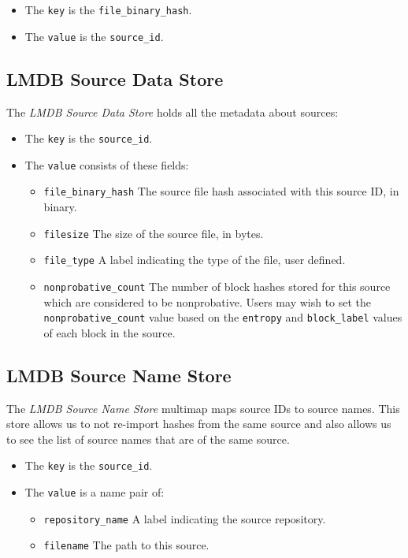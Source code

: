\documentclass[11pt,fleqn]{article} %
\begin{document}
\begin{itemize}
\item The \verb+key+ is the \verb+file_binary_hash+.
\item The \verb+value+ is the \verb+source_id+.
\end{itemize}

\subsection{LMDB Source Data Store}
The \textit{LMDB Source Data Store} holds all the metadata about sources:
\begin{itemize}
\item The \verb+key+ is the \verb+source_id+.
\item The \verb+value+ consists of these fields:
  \begin{itemize}
  \item \verb+file_binary_hash+ The source file hash associated with this source ID, in binary.
  \item \verb+filesize+ The size of the source file, in bytes.
  \item \verb+file_type+ A label indicating the type of the file, user defined.
  \item \verb+nonprobative_count+ The number of block hashes stored for this source which are considered to be nonprobative.  Users may wish to set the \verb+nonprobative_count+ value based on the \verb+entropy+ and \verb+block_label+ values of each block in the source.
  \end{itemize}
\end{itemize}

\subsection{LMDB Source Name Store}
The \textit{LMDB Source Name Store} multimap maps source IDs to source names.  This store allows us to not re-import hashes from the same source and also allows us to see the list of source names that are of the same source.
\begin{itemize}
\item The \verb+key+ is the \verb+source_id+.
\item The \verb+value+ is a name pair of:
  \begin{itemize}
  \item \verb+repository_name+ A label indicating the source repository.
  \item \verb+filename+ The path to this source.
  \end{itemize}
\end{itemize}
\end{document}

